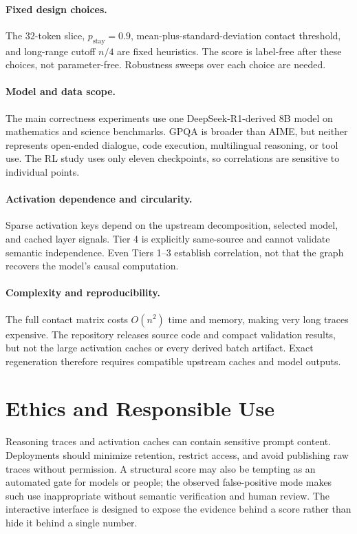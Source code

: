 \documentclass{article}
\begin{document}
\paragraph{Fixed design choices.}
The 32-token slice, $p_{\mathrm{stay}}=0.9$, mean-plus-standard-deviation contact threshold, and long-range cutoff $n/4$ are fixed heuristics. The score is label-free after these choices, not parameter-free. Robustness sweeps over each choice are needed.

\paragraph{Model and data scope.}
The main correctness experiments use one DeepSeek-R1-derived 8B model on mathematics and science benchmarks. GPQA is broader than AIME, but neither represents open-ended dialogue, code execution, multilingual reasoning, or tool use. The RL study uses only eleven checkpoints, so correlations are sensitive to individual points.

\paragraph{Activation dependence and circularity.}
Sparse activation keys depend on the upstream decomposition, selected model, and cached layer signals. Tier 4 is explicitly same-source and cannot validate semantic independence. Even Tiers 1--3 establish correlation, not that the graph recovers the model's causal computation.

\paragraph{Complexity and reproducibility.}
The full contact matrix costs $O(n^2)$ time and memory, making very long traces expensive. The repository releases source code and compact validation results, but not the large activation caches or every derived batch artifact. Exact regeneration therefore requires compatible upstream caches and model outputs.

\section{Ethics and Responsible Use}

Reasoning traces and activation caches can contain sensitive prompt content. Deployments should minimize retention, restrict access, and avoid publishing raw traces without permission. A structural score may also be tempting as an automated gate for models or people; the observed false-positive mode makes such use inappropriate without semantic verification and human review. The interactive interface is designed to expose the evidence behind a score rather than hide it behind a single number.
\end{document}
